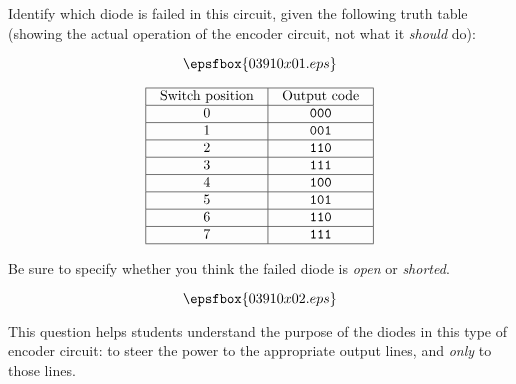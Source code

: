 

Identify which diode is failed in this circuit, given the following truth table (showing the actual operation of the encoder circuit, not what it {\it should} do):

$$\epsfbox{03910x01.eps}$$


$$\vbox{\offinterlineskip
\halign{\strut
\vrule \quad\hfil # \ \hfil & 
\vrule \quad\hfil # \ \hfil \vrule \cr
\noalign{\hrule}
%
Switch position & Output code \cr
%
\noalign{\hrule}
%
0 & {\tt 000} \cr
%
\noalign{\hrule}
%
1 & {\tt 001} \cr
%
\noalign{\hrule}
%
2 & {\tt 110} \cr
%
\noalign{\hrule}
%
3 & {\tt 111} \cr
%
\noalign{\hrule}
%
4 & {\tt 100} \cr
%
\noalign{\hrule}
%
5 & {\tt 101} \cr
%
\noalign{\hrule}
%
6 & {\tt 110} \cr
%
\noalign{\hrule}
%
7 & {\tt 111} \cr
%
\noalign{\hrule}
} %
}$$ %

Be sure to specify whether you think the failed diode is {\it open} or {\it shorted}.







$$\epsfbox{03910x02.eps}$$







This question helps students understand the purpose of the diodes in this type of encoder circuit: to steer the power to the appropriate output lines, and {\it only} to those lines.




